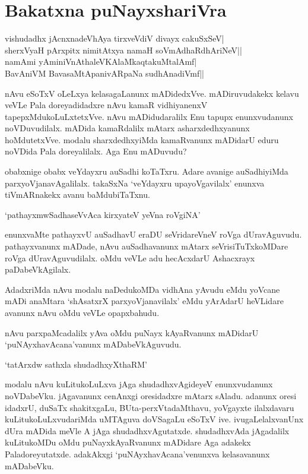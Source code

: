 \chapter{Bakatxna puNayxshariVra}

\begin{shloka}
vishudadhx jAcnxnadeVhAya tirxveVdiV divayx cakuSxSeV|\\
sherxVyaH pArxpitx nimitAtxya namaH soVmAdhaRdhAriNeV||\\
namAmi yAminiVnAthaleVKAlaMkaqtakuMtalAmf|\\
BavAniVM BavasaMtApanivARpaNa sudhAnadiVmf||
\end{shloka}

nAvu eSoTxV oLeLxya kelasagaLanunx mADidedxVve. mADiruvudakekx kelavu veVLe Pala doreyadidadxre nAvu kamaR vidhiyanenxV tapepxMdukoLuLxtetxVve. nAvu mADidudaralilx Enu tapupx enunxvudanunx noVDuvudilalx. mADida kamaRdalilx mAtarx asharxdedhxyanunx hoMdutetxVve. modalu sharxdedhxyiMda kamaRvanunx mADidarU eduru noVDida Pala doreyalilalx. Aga Enu mADuvudu?

obabxnige obabx veYdayxru auSadhi koTaTxru. Adare avanige auSadhiyiMda parxyoVjanavAgalilalx. takaSxNa `veYdayxru upayoVgavilalx' enunxva tiVmARnakekx avanu baMdubiTaTxnu.

\begin{shloka}
`pathayxmwSadhaseVvAca kirxyateV yeVna roVgiNA' 
\end{shloka}

\noindent enunxvaMte pathayxvU auSadhavU eraDU seVridareVneV roVga dUravAguvudu. pathayxvanunx mADade, nAvu auSadhavanunx mAtarx seVrisiTuTxkoMDare roVga dUravAguvudilalx. oMdu veVLe adu hecAcxdarU Ashacxrayx paDabeVkAgilalx.

AdadxriMda nAvu modalu naDedukoMDa vidhAna yAvudu eMdu yoVcane mADi anaMtara `shAsatxrX parxyoVjanavilalx' eMdu yArAdarU heVLidare avanunx nAvu oMdu veVLe opapxbahudu.

nAvu parxpaMcadalilx yAva oMdu puNayx kAyaRvanunx mADidarU `puNAyxhavAcana'vanunx mADabeVkAguvudu.

\begin{shloka}
`tatArxdw sathxla shudadhxyXthaRM'
\end{shloka}
 
modalu nAvu kuLitukoLuLxva jAga shudadhxvAgideyeV enunxvudanunx noVDabeVku. jAgavanunx cenAnxgi oresidadxre mAtarx sAladu. adanunx oresi idadxrU, duSaTx shakitxgaLu, BUta-perxVtadaMthavu, yoVgayxte ilalxdavaru kuLitukoLuLxvudariMda uMTAguva doVSagaLu eSoTxV ive. ivugaLelalxvanUnx dUra mADida meVle A jAga shudadhxvAgutatxde. shudadhxvAda jAgadalilx kuLitukoMDu oMdu puNayxkAyaRvanunx mADidare Aga adakekx Paladoreyutatxde. adakAkxgi `puNAyxhavAcana'venunxva kelasavanunx mADabeVku.

